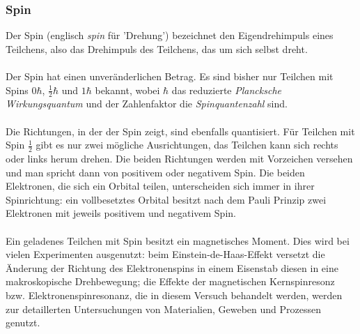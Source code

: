 \documentclass[a4paper,titlepage]{scrartcl}
\numberwithin{equation}{section}
\begin{document}
\subsubsection{Spin}
Der Spin (englisch \emph{spin} für 'Drehung') bezeichnet den Eigendrehimpuls eines Teilchens, also das Drehimpuls des Teilchens, das um sich selbst dreht. \cite{wiki:spin}\\ \\
Der Spin hat einen unveränderlichen Betrag. Es sind bisher nur Teilchen mit Spins $0 \hbar$, $\frac{1}{2} \hbar$ und $1 \hbar$ bekannt, wobei $\hbar$ das reduzierte \emph{Plancksche Wirkungsquantum} und der Zahlenfaktor die \emph{Spinquantenzahl} sind. \cite{wiki:spin}\\ \\
Die Richtungen, in der der Spin zeigt, sind ebenfalls quantisiert. Für Teilchen mit Spin $\frac{1}{2}$ gibt es nur zwei mögliche Ausrichtungen, das Teilchen kann sich rechts oder links herum drehen. Die beiden Richtungen werden mit Vorzeichen versehen und man spricht dann von positivem oder negativem Spin. Die beiden Elektronen, die sich ein Orbital teilen, unterscheiden sich immer in ihrer Spinrichtung: ein vollbesetztes Orbital besitzt nach dem Pauli Prinzip zwei Elektronen mit jeweils positivem und negativem Spin. \cite{web:spin}\\ \\
Ein geladenes Teilchen mit Spin besitzt ein magnetisches Moment. Dies wird bei vielen Experimenten ausgenutzt: beim Einstein-de-Haas-Effekt versetzt die Änderung der Richtung des Elektronenspins in einem Eisenstab diesen in eine makroskopische Drehbewegung; die Effekte der magnetischen Kernspinresonz bzw. Elektronenspinresonanz, die in diesem Versuch behandelt werden, werden zur detaillerten Untersuchungen von Materialien, Geweben und Prozessen genutzt. \cite{wiki:spin}
\end{document}
